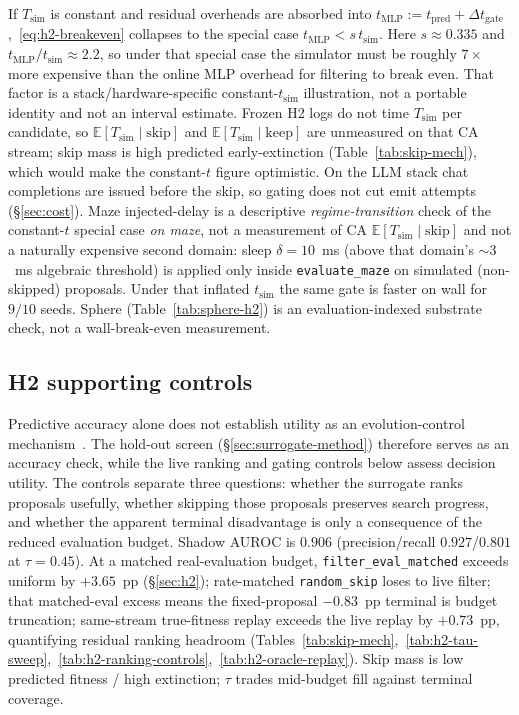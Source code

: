 \documentclass[preprint,12pt]{elsarticle}
\begin{document}
If $T_{\mathrm{sim}}$ is constant and residual overheads are absorbed into $t_{\mathrm{MLP}}:=t_{\mathrm{pred}}+\Delta t_{\mathrm{gate}}$,~\eqref{eq:h2-breakeven} collapses to the special case $t_{\mathrm{MLP}}<s\,t_{\mathrm{sim}}$. Here $s{\approx}0.335$ and $t_{\mathrm{MLP}}/t_{\mathrm{sim}}\approx 2.2$, so under that special case the simulator must be roughly $7\times$ more expensive than the online MLP overhead for filtering to break even. That factor is a stack/hardware-specific constant-$t_{\mathrm{sim}}$ illustration, not a portable identity and not an interval estimate. Frozen H2 logs do not time $T_{\mathrm{sim}}$ per candidate, so $\mathbb{E}[T_{\mathrm{sim}}\mid\mathrm{skip}]$ and $\mathbb{E}[T_{\mathrm{sim}}\mid\mathrm{keep}]$ are unmeasured on that CA stream; skip mass is high predicted early-extinction (Table~\ref{tab:skip-mech}), which would make the constant-$t$ figure optimistic. On the LLM stack chat completions are issued before the skip, so gating does not cut emit attempts (\S\ref{sec:cost}). Maze injected-delay is a descriptive \emph{regime-transition} check of the constant-$t$ special case \emph{on maze}, not a measurement of CA $\mathbb{E}[T_{\mathrm{sim}}\mid\mathrm{skip}]$ and not a naturally expensive second domain: sleep $\delta{=}10$~ms (above that domain's ${\sim}3$~ms algebraic threshold) is applied only inside \texttt{evaluate\_maze} on simulated (non-skipped) proposals. Under that inflated $t_{\mathrm{sim}}$ the same gate is faster on wall for $9/10$ seeds. Sphere (Table~\ref{tab:sphere-h2}) is an evaluation-indexed substrate check, not a wall-break-even measurement.

\subsection{H2 supporting controls}
\label{sec:h2-impl-threat}

Predictive accuracy alone does not establish utility as an evolution-control mechanism~\cite{jin2005fitness}. The hold-out screen (\S\ref{sec:surrogate-method}) therefore serves as an accuracy check, while the live ranking and gating controls below assess decision utility. The controls separate three questions: whether the surrogate ranks proposals usefully, whether skipping those proposals preserves search progress, and whether the apparent terminal disadvantage is only a consequence of the reduced evaluation budget. Shadow AUROC is $0.906$ (precision/recall $0.927$/$0.801$ at $\tau{=}0.45$). At a matched real-evaluation budget, \texttt{filter\_eval\_matched} exceeds uniform by $+3.65$~pp (\S\ref{sec:h2}); rate-matched \texttt{random\_skip} loses to live filter; that matched-eval excess means the fixed-proposal $-0.83$~pp terminal is budget truncation; same-stream true-fitness replay exceeds the live replay by $+0.73$~pp, quantifying residual ranking headroom (Tables~\ref{tab:skip-mech},~\ref{tab:h2-tau-sweep},~\ref{tab:h2-ranking-controls},~\ref{tab:h2-oracle-replay}). Skip mass is low predicted fitness / high extinction; $\tau$ trades mid-budget fill against terminal coverage.
\end{document}
